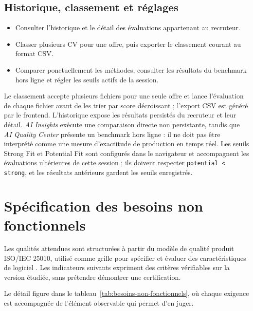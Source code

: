 \subsection{Historique, classement et réglages}
\begin{itemize}
  \item Consulter l'historique et le détail des évaluations appartenant au recruteur.
  \item Classer plusieurs CV pour une offre, puis exporter le classement courant au format CSV.
  \item Comparer ponctuellement les méthodes, consulter les résultats du benchmark hors ligne et régler les seuils actifs de la session.
\end{itemize}

Le classement accepte plusieurs fichiers pour une seule offre et lance l'évaluation de chaque fichier avant de les trier par score décroissant ; l'export CSV est généré par le frontend. L'historique expose les résultats persistés du recruteur et leur détail. \textit{AI Insights} exécute une comparaison directe non persistante, tandis que \textit{AI Quality Center} présente un benchmark hors ligne : il ne doit pas être interprété comme une mesure d'exactitude de production en temps réel. Les seuils Strong Fit et Potential Fit sont configurés dans le navigateur et accompagnent les évaluations ultérieures de cette session ; ils doivent respecter \texttt{potential < strong}, et les résultats antérieurs gardent les seuils enregistrés.

\section{Spécification des besoins non fonctionnels}
Les qualités attendues sont structurées à partir du modèle de qualité produit ISO/IEC 25010, utilisé comme grille pour spécifier et évaluer des caractéristiques de logiciel \cite{iso25010_2023}. Les indicateurs suivants expriment des critères vérifiables sur la version étudiée, sans prétendre démontrer une certification.

Le détail figure dans le tableau~\ref{tab:besoins-non-fonctionnels}, où chaque exigence est accompagnée de l'élément observable qui permet d'en juger.

